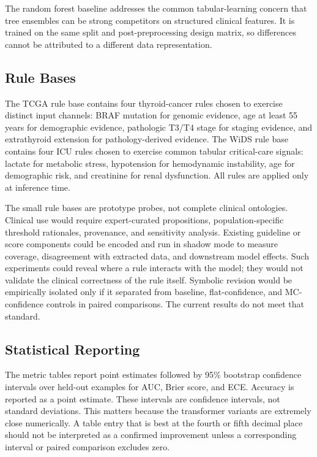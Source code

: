 \documentclass[final]{nesy2026}
\begin{document}
The random forest baseline addresses the common tabular-learning concern that tree ensembles can be strong competitors on structured clinical features. It is trained on the same split and post-preprocessing design matrix, so differences cannot be attributed to a different data representation.

\subsection{Rule Bases}

The TCGA rule base contains four thyroid-cancer rules chosen to exercise distinct input channels: BRAF mutation for genomic evidence, age at least 55 years for demographic evidence, pathologic T3/T4 stage for staging evidence, and extrathyroid extension for pathology-derived evidence. The WiDS rule base contains four ICU rules chosen to exercise common tabular critical-care signals: lactate for metabolic stress, hypotension for hemodynamic instability, age for demographic risk, and creatinine for renal dysfunction. All rules are applied only at inference time.


The small rule bases are prototype probes, not complete clinical ontologies. Clinical use would require expert-curated propositions, population-specific threshold rationales, provenance, and sensitivity analysis. Existing guideline or score components could be encoded and run in shadow mode to measure coverage, disagreement with extracted data, and downstream model effects. Such experiments could reveal where a rule interacts with the model; they would not validate the clinical correctness of the rule itself. Symbolic revision would be empirically isolated only if it separated from baseline, flat-confidence, and MC-confidence controls in paired comparisons. The current results do not meet that standard.

\subsection{Statistical Reporting}

The metric tables report point estimates followed by 95\% bootstrap confidence intervals over held-out examples for AUC, Brier score, and ECE. Accuracy is reported as a point estimate. These intervals are confidence intervals, not standard deviations. This matters because the transformer variants are extremely close numerically. A table entry that is best at the fourth or fifth decimal place should not be interpreted as a confirmed improvement unless a corresponding interval or paired comparison excludes zero.
\end{document}
